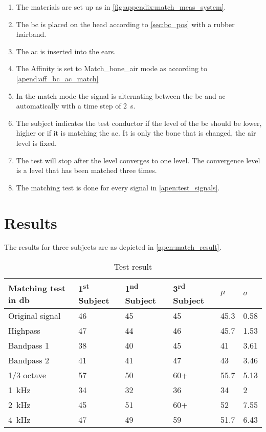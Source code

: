 \begin{enumerate}
\item The materials are set up as in \autoref{fig:appendix:match_meas_system}.
\item The \gls{bc} is placed on the head according to \autoref{sec:bc_pos} with a rubber hairband.
\item The \gls{ac} is inserted into the ears.
\item The Affinity is set to Match_bone_air mode as according to \autoref{apend:aff_bc_ac_match} 
\item In the match mode the signal is alternating between the \gls{bc} and \gls{ac} automatically with a time step of \SI{2}{\second}.
\item The  subject indicates the test conductor if the level of the \gls{bc} should be lower, higher or if it is matching the \gls{ac}. It is only the bone that is changed, the air level is fixed.
\item The test will stop after the level converges to one level. The convergence level is a level that has been matched three times.
\item The matching test is done for every signal in \autoref{apen:test_signals}.
\end{enumerate}

\section*{Results}

The results for three subjects are as depicted in \autoref{apen:match_result}. 

\begin{table}[H]
\centering
\caption{Test result}
\begin{tabular}{l|lll|ll}
Matching test in \si{\decibel}       & 1\textsuperscript{st}  Subject & 1\textsuperscript{nd}  Subject & 3\textsuperscript{rd}  Subject & $\mu$ & $\sigma$ \\ \hline
Original signal         & 46        & 45        & 45        & 45.3        & 0.58               \\
Highpass         & 47        & 44        & 46        & 45.7        & 1.53               \\
Bandpass 1         & 38        & 40        & 45        & 41          & 3.61               \\
Bandpass 2        & 41        & 41        & 47        & 43          & 3.46               \\
1/3 octave & 57        & 50        & 60+       & 55.7        & 5.13               \\
\SI{1}{\kilo\hertz}                   & 34        & 32        & 36        & 34          & 2                  \\
\SI{2}{\kilo\hertz}                  & 45        & 51        & 60+       & 52          & 7.55               \\
\SI{4}{\kilo\hertz}                  & 47        & 49        & 59        & 51.7        &  6.43                 
\end{tabular}
\label{apen:match_result}
\end{table}

